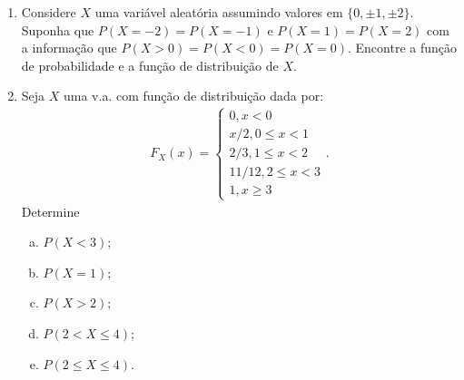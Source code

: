 \documentclass[../Notas.tex]{subfiles}
\begin{document}
\begin{enumerate}
\begin{enumerate}[a)]
    \end{enumerate}
    \item Considere $X$ uma variável aleatória assumindo valores em $\{0, \pm 1, \pm 2\}$. Suponha que $P(X = -2) = P(X = -1)$ e $P(X = 1) = P (X = 2)$ com a informação que $P(X > 0) = P(X < 0) = P(X = 0)$. Encontre a função de probabilidade e a função de distribuição de $X$.
    \item Seja $X$ uma v.a. com função de distribuição dada por:
    \begin{align*}
        F_X(x) = \begin{cases}
            0, x < 0 \\
            x/2, 0\leq x < 1 \\
            2/3, 1\leq x < 2 \\
            11/12, 2\leq x < 3 \\
            1, x\geq 3
        \end{cases}.
    \end{align*}
    Determine
    \begin{enumerate}[a)]
        \item $P(X < 3)$; 
        \item $P(X = 1)$; 
        \item $P (X > 2 )$; 
        \item $P(2 < X \leq 4)$; 
        \item $P(2 \leq X \leq 4)$.
    \end{enumerate}
    
    
    
\end{enumerate}
\end{document}
